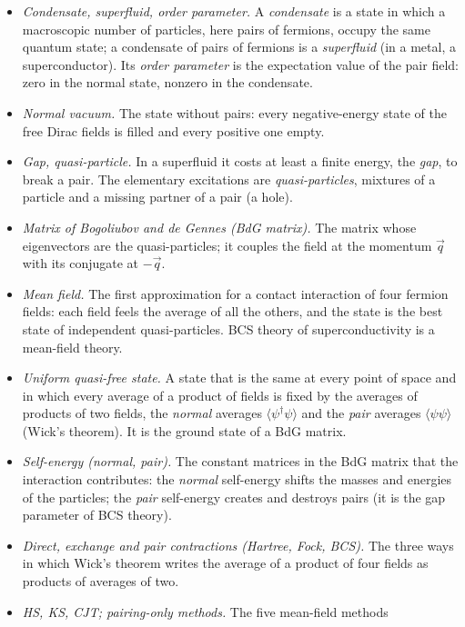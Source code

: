 \documentclass[
  10pt,
]{article}
\providecommand{\tightlist}{%
  \setlength{\itemsep}{0pt}\setlength{\parskip}{0pt}}
\begin{document}
\begin{itemize}
\tightlist
\item
  \emph{Condensate, superfluid, order parameter.} A \emph{condensate} is
  a state in which a macroscopic number of particles, here pairs of
  fermions, occupy the same quantum state; a condensate of pairs of
  fermions is a \emph{superfluid} (in a metal, a superconductor). Its
  \emph{order parameter} is the expectation value of the pair field:
  zero in the normal state, nonzero in the condensate.
\item
  \emph{Normal vacuum.} The state without pairs: every negative-energy
  state of the free Dirac fields is filled and every positive one empty.
\item
  \emph{Gap, quasi-particle.} In a superfluid it costs at least a finite
  energy, the \emph{gap}, to break a pair. The elementary excitations
  are \emph{quasi-particles}, mixtures of a particle and a missing
  partner of a pair (a hole).
\item
  \emph{Matrix of Bogoliubov and de Gennes (BdG matrix).} The matrix
  whose eigenvectors are the quasi-particles; it couples the field at
  the momentum \(\vec q\) with its conjugate at \(-\vec q\).
\item
  \emph{Mean field.} The first approximation for a contact interaction
  of four fermion fields: each field feels the average of all the
  others, and the state is the best state of independent
  quasi-particles. BCS theory of superconductivity is a mean-field
  theory.
\item
  \emph{Uniform quasi-free state.} A state that is the same at every
  point of space and in which every average of a product of fields is
  fixed by the averages of products of two fields, the \emph{normal}
  averages \(\langle\psi^\dagger\psi\rangle\) and the \emph{pair}
  averages \(\langle\psi\psi\rangle\) (Wick's theorem). It is the ground
  state of a BdG matrix.
\item
  \emph{Self-energy (normal, pair).} The constant matrices in the BdG
  matrix that the interaction contributes: the \emph{normal} self-energy
  shifts the masses and energies of the particles; the \emph{pair}
  self-energy creates and destroys pairs (it is the gap parameter of BCS
  theory).
\item
  \emph{Direct, exchange and pair contractions (Hartree, Fock, BCS).}
  The three ways in which Wick's theorem writes the average of a product
  of four fields as products of averages of two.
\item
  \emph{HS, KS, CJT; pairing-only methods.} The five mean-field methods

\end{itemize}
\end{document}
